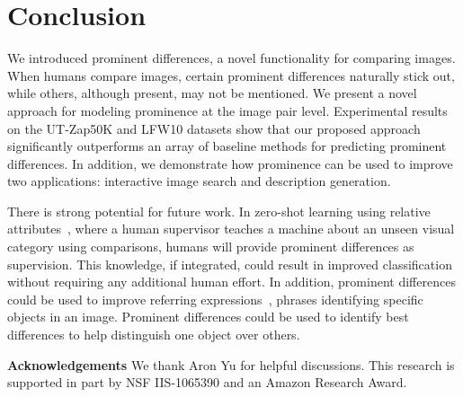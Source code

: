 \documentclass[10pt,twocolumn,letterpaper]{article}
\begin{document}
\begin{table}
\centering
{}
\caption[Description Generation Study Results]{Description generation human study results.}
\label{table:desc}
\end{table}


\section{Conclusion}

We introduced prominent differences, a novel functionality for comparing images. When humans compare images, certain prominent differences naturally stick out, while others, although present, may not be mentioned. We present a novel approach for modeling prominence at the image pair level. Experimental results on the UT-Zap50K and LFW10 datasets show that our proposed approach significantly outperforms an array of baseline methods for predicting prominent differences. In addition, we demonstrate how prominence can be used to improve two applications: interactive image search and description generation.

There is strong potential for future work. In zero-shot learning using relative attributes~\cite{relativeattributes}, where a human supervisor teaches a machine about an unseen visual category using comparisons, humans will provide prominent differences as supervision. This knowledge, if integrated, could result in improved classification without requiring any additional human effort. In addition, prominent differences could be used to improve referring expressions~\cite{referring, unambiguousdescription}, phrases identifying specific objects in an image. Prominent differences could be used to identify best differences to help distinguish one object over others.

\vspace{0.2cm}

\noindent \textbf{Acknowledgements} \hspace{1em} We thank Aron Yu for helpful discussions. This research is supported in part by NSF IIS-1065390 and an Amazon Research Award.



\end{document}
